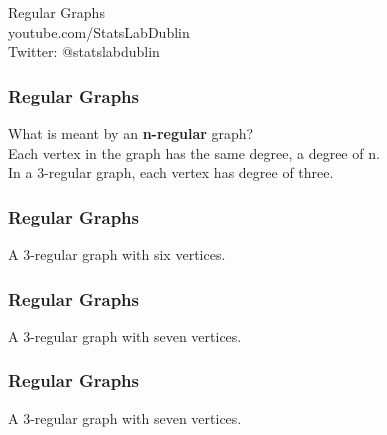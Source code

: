 \documentclass{beamer}
\begin{document}
\begin{frame}
\begin{center}
{ \Huge
Regular Graphs}
\\
\bigskip
{ \Large
youtube.com/StatsLabDublin \\ \vspace{0.2cm} Twitter: @statslabdublin
}
\end{center}
\end{frame}


\begin{frame}
\frametitle{Regular Graphs}
{
\LARGE
What is meant by an \textbf{n-regular} graph?\\
\bigskip
Each vertex in the graph has the same degree, a degree of n.
\\
\bigskip
In a 3-regular graph, each vertex has degree of three.

}
\end{frame}

\begin{frame}
\frametitle{Regular Graphs}
{\huge
\vspace{-3cm}
A 3-regular graph with six vertices.
}
\end{frame}
\begin{frame}
\frametitle{Regular Graphs}
{\huge 
\vspace{-3cm}
A 3-regular graph with seven vertices.
}
\end{frame}
\begin{frame}
\frametitle{Regular Graphs}
{\huge 
\vspace{-3cm}
A 3-regular graph with seven vertices.
}
\end{frame}
\end{document}
